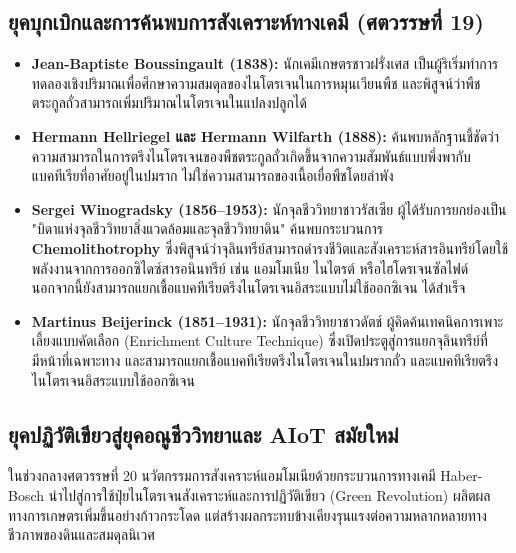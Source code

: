 \subsection{ยุคบุกเบิกและการค้นพบการสังเคราะห์ทางเคมี (ศตวรรษที่ 19)}

\begin{itemize}
    \item \textbf{Jean-Baptiste Boussingault (1838):} นักเคมีเกษตรชาวฝรั่งเศส เป็นผู้ริเริ่มทำการทดลองเชิงปริมาณเพื่อศึกษาความสมดุลของไนโตรเจนในการหมุนเวียนพืช และพิสูจน์ว่าพืชตระกูลถั่วสามารถเพิ่มปริมาณไนโตรเจนในแปลงปลูกได้
    \item \textbf{Hermann Hellriegel และ Hermann Wilfarth (1888):} ค้นพบหลักฐานชี้ชัดว่าความสามารถในการตรึงไนโตรเจนของพืชตระกูลถั่วเกิดขึ้นจากความสัมพันธ์แบบพึ่งพากับแบคทีเรียที่อาศัยอยู่ในปมราก ไม่ใช่ความสามารถของเนื้อเยื่อพืชโดยลำพัง
    \item \textbf{Sergei Winogradsky (1856--1953):} นักจุลชีววิทยาชาวรัสเซีย ผู้ได้รับการยกย่องเป็น "บิดาแห่งจุลชีววิทยาสิ่งแวดล้อมและจุลชีววิทยาดิน" ค้นพบกระบวนการ \textbf{Chemolithotrophy} ซึ่งพิสูจน์ว่าจุลินทรีย์สามารถดำรงชีวิตและสังเคราะห์สารอินทรีย์โดยใช้พลังงานจากการออกซิไดซ์สารอนินทรีย์ เช่น แอมโมเนีย ไนไตรต์ หรือไฮโดรเจนซัลไฟด์ นอกจากนี้ยังสามารถแยกเชื้อแบคทีเรียตรึงไนโตรเจนอิสระแบบไม่ใช้ออกซิเจน  ได้สำเร็จ
    \item \textbf{Martinus Beijerinck (1851--1931):} นักจุลชีววิทยาชาวดัตช์ ผู้คิดค้นเทคนิคการเพาะเลี้ยงแบบคัดเลือก (Enrichment Culture Technique) ซึ่งเปิดประตูสู่การแยกจุลินทรีย์ที่มีหน้าที่เฉพาะทาง และสามารถแยกเชื้อแบคทีเรียตรึงไนโตรเจนในปมรากถั่ว  และแบคทีเรียตรึงไนโตรเจนอิสระแบบใช้ออกซิเจน 
\end{itemize}

\subsection{ยุคปฏิวัติเขียวสู่ยุคอณูชีววิทยาและ AIoT สมัยใหม่}

ในช่วงกลางศตวรรษที่ 20 นวัตกรรมการสังเคราะห์แอมโมเนียด้วยกระบวนการทางเคมี Haber-Bosch นำไปสู่การใช้ปุ๋ยไนโตรเจนสังเคราะห์และการปฏิวัติเขียว (Green Revolution) ผลิตผลทางการเกษตรเพิ่มขึ้นอย่างก้าวกระโดด แต่สร้างผลกระทบข้างเคียงรุนแรงต่อความหลากหลายทางชีวภาพของดินและสมดุลนิเวศ

